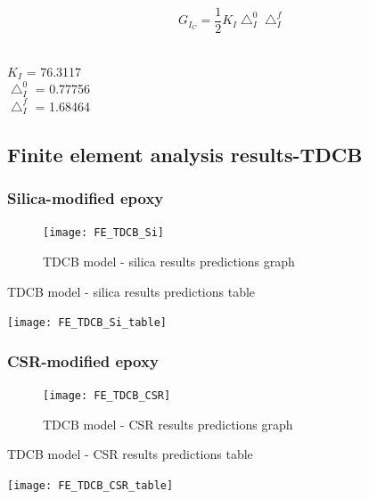 \documentclass[numbers=noendperiod,chapterprefix=on]{icldt} %
\begin{document}
{ \begin{equation} 
 G_{I_C}  =\frac{1}{2}K_{I} \bigtriangleup^{0}_I \bigtriangleup^{f}_I
 \end{equation}
 \\
\begin{center}
 $K_{I}$ = 76.3117 \\
 $\bigtriangleup^{0}_I $ = 0.77756 \\
 $ \bigtriangleup^{f}_I $ = 1.68464\\
\end{center}
 

\subsection{Finite element analysis results-TDCB}


\subsubsection{Silica-modified epoxy}




\begin{figure}[!htpb]
  \centering
  \texttt{[image: FE\_TDCB\_Si]}
  \caption{TDCB model - silica results predictions graph}\label{FE_TDCB_Si}
  \end{figure}
  \FloatBarrier


\begin{table}[!htpb]
  \centering
   \caption{TDCB model - silica results predictions table}\label{FE_TDCB_Si_table}
  \texttt{[image: FE\_TDCB\_Si\_table]}
  \end{table}
  \FloatBarrier



\subsubsection{CSR-modified epoxy}


\begin{figure}[!htpb]
  \centering
  \texttt{[image: FE\_TDCB\_CSR]}
  \caption{TDCB model - CSR results predictions graph}\label{FE_TDCB_CSR}
  \end{figure}
  \FloatBarrier
  
  \begin{table}[!htpb]
    \centering
    \caption{TDCB model - CSR results predictions table}\label{FE_TDCB_CSR_table}
    \texttt{[image: FE\_TDCB\_CSR\_table]}
    \end{table}
    \FloatBarrier

}
\end{document}
